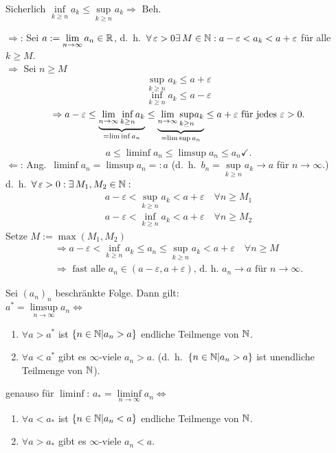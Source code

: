 \documentclass[../ana1.tex]{subfiles}
\begin{document}
\begin{bew}
	\item Sicherlich \( \underset{k\geq n}{\inf}a_k \leq \underset{k\geq n}{\sup} a_k \Rightarrow \) Beh. \checkmark{}
	\item \glqq{}\(\Rightarrow \)\grqq{}: Sei \(a:= \lim\limits_{n\rightarrow\infty}a_n\in\mathbb{R} \), d.\ h.\  \( \forall \varepsilon > 0 \exists M\in\N: a-\varepsilon < a_k < a+ \varepsilon \) für alle \(k \geq M \).\\
	\( \Rightarrow \) Sei \(n\geq M\) 
	\[ \underset{k\geq n}{\sup} a_k \leq a+\varepsilon \]
	\[ \underset{k\geq n}{\inf} a_k \leq a-\varepsilon \]
	\[ \Rightarrow a-\varepsilon \leq \underbrace{\lim\limits_{n\rightarrow\infty}\underset{k\geq n}{\inf}a_k}_{=\liminf a_n} \leq \underbrace{\lim\limits_{n\rightarrow\infty}\underset{k\geq n}{\sup}a_k}_{=\limsup a_n} \leq a+\varepsilon \text{ für jedes } \varepsilon>0. \]
	\[ a\leq \liminf a_n \leq \limsup a_n \leq a_n \checkmark. \]
	\glqq{}\(\Leftarrow \)\grqq{}: Ang.\  \( \liminf a_n = \limsup a_n =: a \) (d.\ h.\  \(b_n =  \underset{k\geq n}{\sup} a_k \rightarrow a \) für \( n\rightarrow\infty \).)\\
	d.\ h.\  \( \forall \varepsilon>0: \exists M_1,M_2 \in\N: \)
	\begin{align*}
		a-\varepsilon < \underset{k\geq n}{\sup} a_k < a + \varepsilon \quad \forall n\geq M_1\\
		a-\varepsilon < \underset{k\geq n}{\inf} a_k < a + \varepsilon \quad \forall n\geq M_2
	\end{align*}
	Setze \(M := \max(M_1, M_2) \) \\
	\begin{align*}
		\Rightarrow a-\varepsilon < \underset{k\geq n}{\inf} a_k \leq a_n \leq \underset{k\geq n}{\sup} a_k < a + \varepsilon \quad \forall n\geq M\\
		\Rightarrow \text{ fast alle } a_n\in(a-\varepsilon,a+\varepsilon)\text{, d.\ h.\ }a_n\rightarrow a \text{ für } n\rightarrow \infty.
	\end{align*}
\end{bew}
\begin{satz}
	Sei \({(a_n)}_n\) beschränkte Folge. Dann gilt:\\
	\(a^* = \limsup\limits_{n\rightarrow\infty}a_n \Leftrightarrow \)
	\begin{enumerate}
		\item \(\forall a> a^* \) ist \( \{n\in\mathbb{N} |a_n>a \} \) endliche Teilmenge von \(\mathbb{N} \).
		\item \( \forall a<a^* \) gibt es \(\infty \)-viele \(a_n >a\). (d.\ h.\  \( \{ n\in\mathbb{N}|a_n>a \} \) ist unendliche Teilmenge von \(\mathbb{N} \)).
	\end{enumerate}
	genauso für \( \liminf \):
	\(a_* = \liminf\limits_{n\rightarrow\infty}a_n \Leftrightarrow \)
	\begin{enumerate}
		\item \(\forall a< a_* \) ist \( \{n\in\mathbb{N} |a_n<a \} \) endliche Teilmenge von \(\mathbb{N} \).
		\item \( \forall a>a_* \) gibt es \(\infty \)-viele \(a_n<a\).
	\end{enumerate}
\end{satz}
\end{document}

